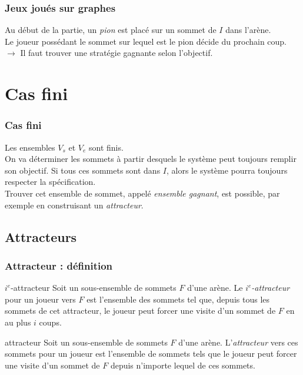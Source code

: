 \documentclass{beamer}
\begin{document}
\begin{frame}
\frametitle{Jeux joués sur graphes}
Au début de la partie, un \emph{pion} est placé sur un sommet de $I$ dans l'arène.\\
Le joueur possédant le sommet sur lequel est le pion décide du prochain coup.\\[10mm]
$\rightarrow$ Il faut trouver une stratégie gagnante selon l'objectif.
\end{frame}

\section{Cas fini}
\begin{frame}
\frametitle{Cas fini} %
Les ensembles $V_s$ et $V_e$ sont finis.\\[3mm]
On va déterminer les sommets à partir desquels le système peut toujours remplir son objectif. Si tous ces sommets sont dans $I$, alors le système pourra toujours respecter la spécification.\\[3mm]
Trouver cet ensemble de sommet, appelé \emph{ensemble gagnant}, est possible, par exemple en construisant un \emph{attracteur}.
\end{frame}

\subsection{Attracteurs}
\begin{frame}
\frametitle{Attracteur : définition}
\begin{block}{$i^e$-attracteur}
Soit un sous-ensemble de sommets $F$ d'une arène. Le \emph{$i^e$-attracteur} pour un joueur vers $F$ est l'ensemble des sommets tel que, depuis tous les sommets de cet attracteur, le joueur peut forcer une visite d'un sommet de $F$ en au plus $i$ coups.
\end{block}

\begin{block}{attracteur}
Soit un sous-ensemble de sommets $F$ d'une arène. L'\emph{attracteur} vers ces sommets pour un joueur est l'ensemble de sommets tels que le joueur peut forcer une visite d'un sommet de $F$ depuis n'importe lequel de ces sommets.
\end{block}
\end{frame}
\end{document}
